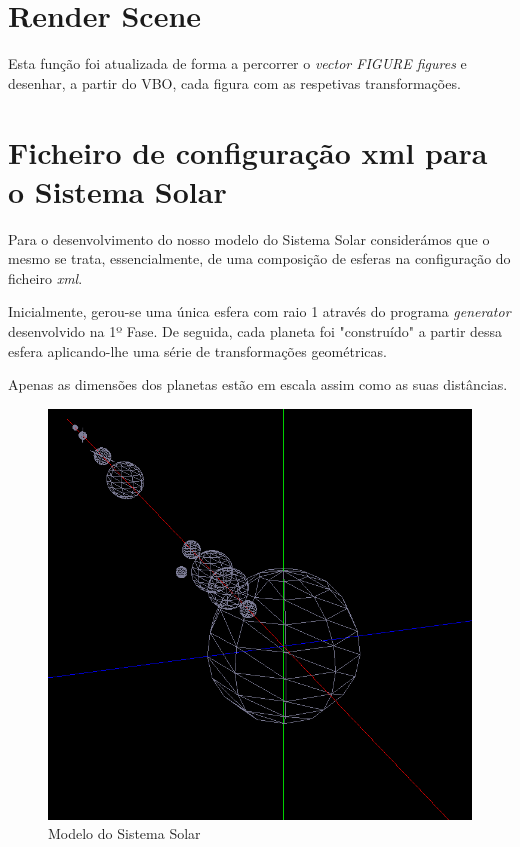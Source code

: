 \documentclass[11pt,a4paper]{report}
\begin{document}
\section{Render Scene}
Esta função foi atualizada de forma a percorrer o \emph{vector FIGURE figures} e desenhar, a partir do VBO, cada figura com as respetivas transformações.
\section{Ficheiro de configuração xml para o Sistema Solar}
Para o desenvolvimento do nosso modelo do Sistema Solar considerámos que o mesmo se trata, essencialmente, de uma composição de esferas na configuração do ficheiro  \emph{xml}.

Inicialmente, gerou-se uma única esfera com raio 1 através do programa \emph{generator} desenvolvido na 1º Fase. De seguida, cada planeta foi "construído" a partir dessa esfera aplicando-lhe uma série de transformações geométricas. 

Apenas as dimensões dos planetas estão em escala assim como as suas distâncias.

\begin{figure}
	\centering
	\includegraphics[width=\textwidth]{sistema_solar.png}\par\vspace{1cm}
      \caption{Modelo do Sistema Solar}
\end{figure}
\end{document}
